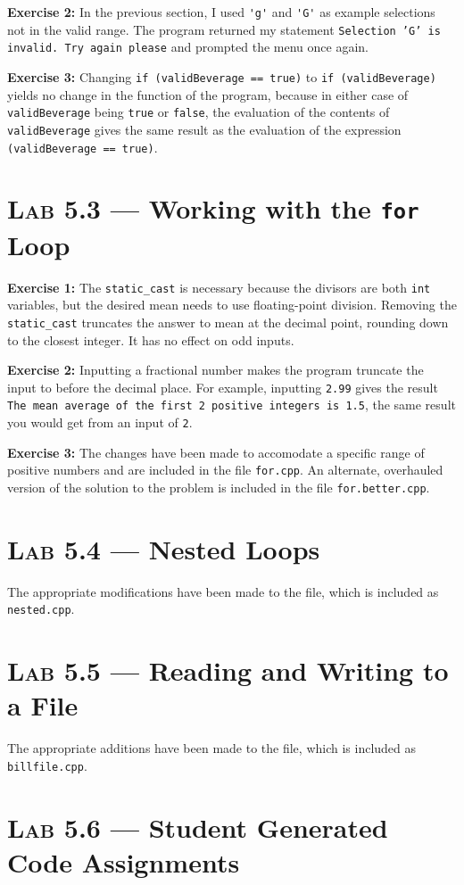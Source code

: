 \documentclass[11pt]{article}
\begin{document}
	\textbf{Exercise 2:} In the previous section, I used \lstinline{'g'} and \lstinline{'G'} as example selections not in the valid range. The program returned my statement \texttt{Selection 'G' is invalid. Try again please} and prompted the menu once again.
	
	\textbf{Exercise 3:} Changing \lstinline{if (validBeverage == true)} to \lstinline{if (validBeverage)} yields no change in the function of the program, because in either case of \lstinline{validBeverage} being \lstinline{true} or \lstinline{false}, the evaluation of the contents of \lstinline{validBeverage} gives the same result as the evaluation of the expression \lstinline{(validBeverage == true)}.
	

\section*{\textsc{Lab 5.3} --- Working with the \texttt{for} Loop}
	
	\textbf{Exercise 1:} The \lstinline{static_cast} is necessary because the divisors are both \lstinline{int} variables, but the desired mean needs to use floating-point division. Removing the \lstinline{static_cast} truncates the answer to mean at the decimal point, rounding down to the closest integer. It has no effect on odd inputs.
	
	\textbf{Exercise 2:} Inputting a fractional number makes the program truncate the input to before the decimal place. For example, inputting \texttt{2.99} gives the result \texttt{The mean average of the first 2 positive integers is 1.5}, the same result you would get from an input of \texttt{2}.
	
	\textbf{Exercise 3:} The changes have been made to accomodate a specific range of positive numbers and are included in the file \texttt{for.cpp}. An alternate, overhauled version of the solution to the problem is included in the file \texttt{for.better.cpp}.
	

\section*{\textsc{Lab 5.4} --- Nested Loops}
\noindent	The appropriate modifications have been made to the file, which is included as \texttt{nested.cpp}.
	

\section*{\textsc{Lab 5.5} --- Reading and Writing to a File}
\noindent	The appropriate additions have been made to the file, which is included as \texttt{billfile.cpp}.


\section*{\textsc{Lab 5.6} --- Student Generated Code Assignments}
\end{document}

